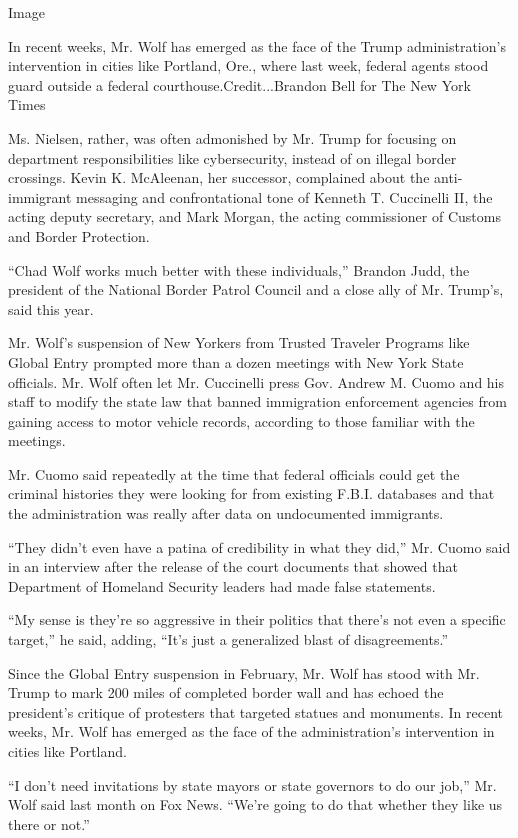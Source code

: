 Image

In recent weeks, Mr. Wolf has emerged as the face of the Trump
administration's intervention in cities like Portland, Ore., where last
week, federal agents stood guard outside a federal
courthouse.Credit...Brandon Bell for The New York Times

Ms. Nielsen, rather, was often admonished by Mr. Trump for focusing on
department responsibilities like cybersecurity, instead of on illegal
border crossings. Kevin K. McAleenan, her successor, complained about
the anti-immigrant messaging and confrontational tone of Kenneth T.
Cuccinelli II, the acting deputy secretary, and Mark Morgan, the acting
commissioner of Customs and Border Protection.

``Chad Wolf works much better with these individuals,'' Brandon Judd,
the president of the National Border Patrol Council and a close ally of
Mr. Trump's, said this year.

Mr. Wolf's suspension of New Yorkers from Trusted Traveler Programs like
Global Entry prompted more than a dozen meetings with New York State
officials. Mr. Wolf often let Mr. Cuccinelli press Gov. Andrew M. Cuomo
and his staff to modify the state law that banned immigration
enforcement agencies from gaining access to motor vehicle records,
according to those familiar with the meetings.

Mr. Cuomo said repeatedly at the time that federal officials could get
the criminal histories they were looking for from existing F.B.I.
databases and that the administration was really after data on
undocumented immigrants.

``They didn't even have a patina of credibility in what they did,'' Mr.
Cuomo said in an interview after the release of the court documents that
showed that Department of Homeland Security leaders had made false
statements.

``My sense is they're so aggressive in their politics that there's not
even a specific target,'' he said, adding, ``It's just a generalized
blast of disagreements.''

Since the Global Entry suspension in February, Mr. Wolf has stood with
Mr. Trump to mark 200 miles of completed border wall and has echoed the
president's critique of protesters that targeted statues and monuments.
In recent weeks, Mr. Wolf has emerged as the face of the
administration's intervention in cities like Portland.

``I don't need invitations by state mayors or state governors to do our
job,'' Mr. Wolf said last month on Fox News. ``We're going to do that
whether they like us there or not.''

